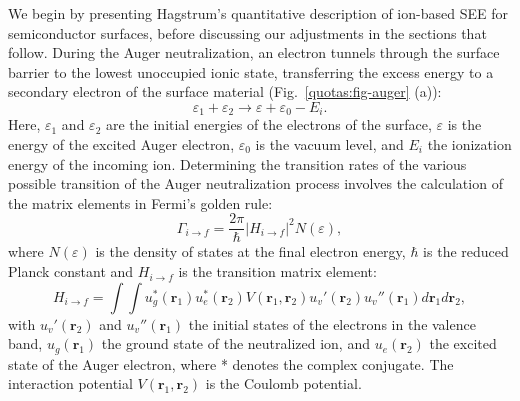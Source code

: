 \begin{refsection}
We begin by presenting Hagstrum's quantitative description of ion-based SEE for semiconductor surfaces, before discussing our adjustments in the sections that follow. During the Auger neutralization, an electron tunnels through the surface barrier to the lowest unoccupied ionic state, transferring the excess energy to a secondary electron of the surface material (Fig.~\ref{quotas:fig-auger} (a)):
\begin{equation} \label{quotas:eq-energyconv}
\varepsilon_1 + \varepsilon_2 \rightarrow \varepsilon + \varepsilon_0 - E_i.
\end{equation}
Here, $\varepsilon_1$ and $\varepsilon_2$ are the initial energies of the electrons of the surface, $\varepsilon$ is the energy of the excited Auger electron, $\varepsilon_0$ is the vacuum level, and $E_i$ the ionization energy of the incoming ion. Determining the transition rates of the various possible transition of the Auger neutralization process involves the calculation of the matrix elements in Fermi's golden rule:
\begin{equation} \label{quotas:eq-fermi}
    \Gamma_{i\rightarrow f} = \frac{2\pi}{\hbar} \left| H_{i\rightarrow f}\right|^2 N(\varepsilon) ,
\end{equation}
where $N(\varepsilon)$ is the density of states at the final electron energy, $\hbar$ is the reduced Planck constant and $H_{i\rightarrow f}$ is the transition matrix element:
\begin{equation}
    H_{i\rightarrow f} = \int \int u^*_g(\mathbf{r}_1) u^*_e(\mathbf{r}_2) V(\mathbf{r}_1, \mathbf{r}_2) u_v'(\mathbf{r}_2) u_v''(\mathbf{r}_1) d\mathbf{r}_1 d\mathbf{r}_2,
\end{equation}
with $ u_v'(\mathbf{r}_2)$ and $ u_v''(\mathbf{r}_1)$ the initial states of the electrons in the valence band, $u_g(\mathbf{r}_1)$ the ground state of the neutralized ion, and $u_e(\mathbf{r}_2)$ the excited state of the Auger electron, where * denotes the complex conjugate. The interaction potential $V(\mathbf{r}_1, \mathbf{r}_2)$ is the Coulomb potential.


\end{refsection}

